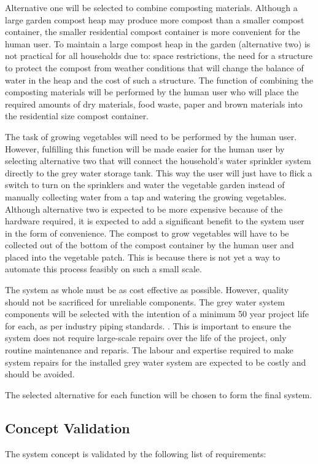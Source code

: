 \documentclass[a4paper,11pt,fleqn]{report}
\begin{document}
Alternative one will be selected to combine composting materials. Although a large garden compost heap may produce more compost than a smaller compost container, the smaller residential compost container is more convenient for the human user. To maintain a large compost heap in the garden (alternative two) is not practical for all households due to: space restrictions, the need for a structure to protect the compost from weather conditions that will change the balance of water in the heap and the cost of such a structure. The function of combining the composting materials will be performed by the human user who will place the required amounts of dry materials, food waste, paper and brown materials into the residential size compost container.

The task of growing vegetables will need to be performed by the human user. However, fulfilling this function will be made easier for the human user by selecting alternative two that will connect the household's water sprinkler system directly to the grey water storage tank. This way the user will just have to flick a switch to turn on the sprinklers and water the vegetable garden instead of manually collecting water from a tap and watering the growing vegetables. Although alternative two is expected to be more expensive because of the hardware required, it is expected to add a significant benefit to the system user in the form of convenience. The compost to grow vegetables will have to be collected out of the bottom of the compost container by the human user and placed into the vegetable patch. This is because there is not yet a way to automate this process feasibly on such a small scale.

The system as whole must be as cost effective as possible. However, quality should not be sacrificed for unreliable components. The grey water system components will be selected with the intention of a minimum 50 year project life for each, as per industry piping standards. \citep{Fischer2012}. This is important to ensure the system does not require large-scale repairs over the life of the project, only routine maintenance and reparis. The labour and expertise required to make system repairs for the installed grey water system are expected to be costly and should be avoided.

The selected alternative for each function will be chosen to form the final system.

\subsection{Concept Validation}
The system concept is validated by the following list of requirements:\\
\end{document}
